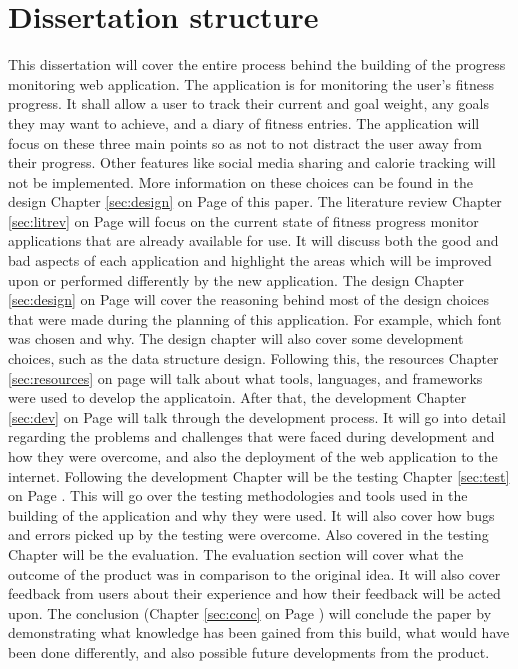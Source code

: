 \section{Dissertation structure}
This dissertation will cover the entire process behind the building of the progress monitoring web application. The application is for monitoring the user's fitness progress. It shall allow a user to track their current and goal weight, any goals they may want to achieve, and a diary of fitness entries. The application will focus on these three main points so as not to not distract the user away from their progress. Other features like social media sharing and calorie tracking will not be implemented. More information on these choices can be found in the design Chapter \ref{sec:design} on Page \pageref{sec:design} of this paper. The literature review Chapter \ref{sec:litrev} on Page \pageref{sec:litrev} will focus on the current state of fitness progress monitor applications that are already available for use. It will discuss both the good and bad aspects of each application and highlight the areas which will be improved upon or performed differently by the new application. The design Chapter \ref{sec:design} on Page \pageref{sec:design} will cover the reasoning behind most of the design choices that were made during the planning of this application. For example, which font was chosen and why. The design chapter will also cover some development choices, such as the data structure design. Following this, the resources Chapter \ref{sec:resources} on page \pageref{sec:resources} will talk about what tools, languages, and frameworks were used to develop the applicatoin. After that, the development Chapter \ref{sec:dev} on Page \pageref{sec:dev} will talk through the development process. It will go into detail regarding the problems and challenges that were faced during development and how they were overcome, and also the deployment of the web application to the internet. Following the development Chapter will be the testing Chapter \ref{sec:test} on Page \pageref{sec:test}. This will go over the testing methodologies and tools used in the building of the application and why they were used. It will also cover how bugs and errors picked up by the testing were overcome. Also covered in the testing Chapter will be the evaluation. The evaluation section will cover what the outcome of the product was in comparison to the original idea. It will also cover feedback from users about their experience and how their feedback will be acted upon. The conclusion (Chapter \ref{sec:conc} on Page \pageref{sec:conc}) will conclude the paper by demonstrating what knowledge has been gained from this build, what would have been done differently, and also possible future developments from the product.\\

